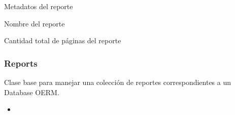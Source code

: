 \documentclass[a4paper,12pt,spanish]{sphinxmanual}
\begin{document}
\begin{fulllineitems}

\begin{fulllineitems}
\label{\detokenize{openerm.Report:openerm.Report.Report.metadata}}
Metadatos del reporte

\end{fulllineitems}


\begin{fulllineitems}
\label{\detokenize{openerm.Report:openerm.Report.Report.nombre}}
Nombre del reporte

\end{fulllineitems}


\begin{fulllineitems}
\label{\detokenize{openerm.Report:openerm.Report.Report.total_pages}}
Cantidad total de páginas del reporte

\end{fulllineitems}


\end{fulllineitems}

\label{\detokenize{openerm.Reports:module-openerm.Reports}}

\subsubsection{Reports}
\label{\detokenize{openerm.Reports:reports}}\label{\detokenize{openerm.Reports::doc}}
Clase base para manejar una colección de reportes correspondientes a
un Database OERM.



\begin{itemize}
\item {} 
{\hyperref[\detokenize{openerm.Report:module-openerm.Report}]{}}

\end{itemize}
\end{document}
